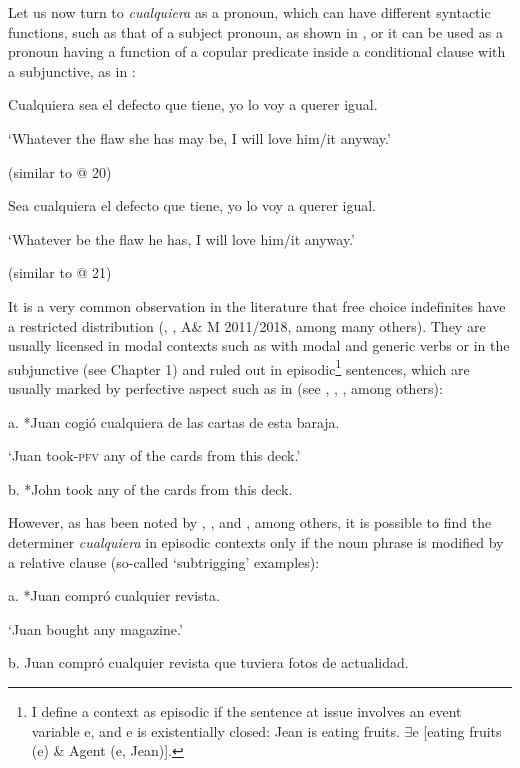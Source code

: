   Let us now turn to \textit{cualquiera} as a pronoun, which can have different syntactic functions, such as that of a subject pronoun, as shown in , or it can be used as a pronoun having a function of a copular predicate inside a conditional clause with a subjunctive, as in :

\label{bkm:Ref533761017}  Cualquiera sea el defecto que tiene, yo lo voy a querer igual.

  ‘Whatever the flaw she has may be, I will love him/it anyway.’

  (similar to @ 20)

\label{bkm:Ref533761034}  Sea cualquiera el defecto que tiene, yo lo voy a querer igual.

  ‘Whatever be the flaw he has, I will love him/it anyway.’

  (similar to @ 21)

It is a very common observation in the literature that free choice indefinites have a restricted distribution (\citealt{Quer2000}, \citealt{Menéndez-Benito2010}, A\& M 2011/2018, among many others). They are usually licensed in modal contexts such as with modal and generic verbs or in the subjunctive (see Chapter 1) and ruled out in episodic\footnote{{I define a context as episodic if the sentence at issue involves an event variable e, and e is existentially closed: Jean is eating fruits. ${\exists}$e [eating fruits (e) \& Agent (e, Jean)].}} sentences, which are usually marked by perfective aspect such as in  (see \citealt{Menéndez-Benito2010}, \citealt{AloniEtAl2010}, \citealt{Dayal2013}, among others):

\label{bkm:Ref41139913}  a.  *Juan cogió cualquiera de las cartas de esta baraja.

    ‘Juan took-\textsc{pfv} any of the cards from this deck.’

  b.  *John took any of the cards from this deck. 

    \citep[34]{Menéndez-Benito2010}

However, as has been noted by \citet{Quer2000}, \citet{Rivero2011}, and \citet{Menéndez-Benito2010}, among others, it is possible to find the determiner \textit{cualquiera} in episodic contexts only if the noun phrase is modified by a relative clause (so-called ‘subtrigging’ examples):

\label{bkm:Ref41139369}  a.  *Juan compró cualquier revista.

    ‘Juan bought any magazine.’

  b.  Juan compró cualquier revista que tuviera fotos de actualidad.

